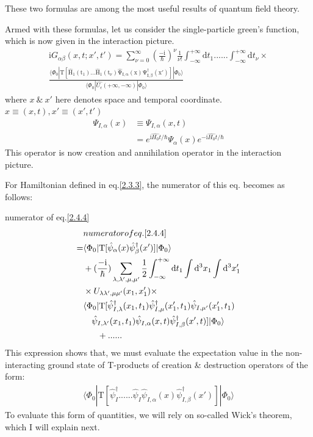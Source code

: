 These two formulas are among the most useful results of quantum field theory.


Armed with these formulas, let us consider the  single-particle green's function, which is now given in the interaction picture.
\begin{align}\label{2.4.4}
\mathrm{i}G_{\alpha\beta}(x,t;x',t')=\sum_{\nu=0}^{\infty}(\frac{-\mathrm{i}}{\hbar})^{\nu} \frac{1}{\nu!} \int_{-\infty}^{+\infty}\mathrm{d}t_1......\int_{-\infty}^{+\infty}\mathrm{d}t_{\nu}\times\nonumber  \\
\frac{\langle\Phi_0|\mathrm{T[\hat H_1(t_1)...\hat H_1(t_{\nu})\hat \Psi_{I,\alpha}(x)\Psi^{\dagger}_{I,\beta}(x')]}
|\Phi_0\rangle}{\langle\Phi_0|\hat{U_{\epsilon}}(+\infty,-\infty)|\Phi_0\rangle}
\end{align}
where $x\ \&\ x'$ here denotes space and temporal coordinate.$x\equiv(x,t),x'\equiv (x',t')$
\begin{align}
\Psi_{I,\alpha}(x)&\equiv\Psi_{I,\alpha}(x,t) \nonumber \\
&=e^{\mathrm{i}\hat{H_0}t/\hbar}\Psi_{\alpha}(x)e^{-\mathrm{i}\hat{H_0}t/\hbar} \nonumber
\end{align}
This operator is now creation and annihilation operator in the interaction picture.

For Hamiltonian defined in eq.\eqref{2.3.3}, the numerator of this eq. becomes as follows:

numerator of eq.\eqref{2.4.4}
\begin{align}\label{2.4.5}
& numerator of eq.\eqref{2.4.4} \nonumber \\
=&\langle \Phi_0|\mathrm{T}[\hat \psi_{\alpha }(x)\hat \psi_{\beta }^{\dagger}(x')]|\Phi_0\rangle \nonumber \\
&+(\frac{-\mathrm{i}}{\hbar})\sum_{\lambda,\lambda',\mu,\mu'}\frac{1}{2}\int_{-\infty}^{+\infty}\mathrm{d}t_1\int\mathrm{d}^3x_1\int\mathrm{d}^3x_1' \nonumber \\
&\times U_{\lambda\lambda',\mu\mu'}(x_1,x_1')\times \nonumber\\
&\langle\Phi_0|\mathrm{T}[\hat \psi_{I,\lambda}^{\dagger}(x_1,t_1)\hat \psi_{I,\mu}^{\dagger}(x_1',t_1)\hat \psi_{I,\mu' }(x_1',t_1) \nonumber \\
&\ \ \ \hat \psi_{I,\lambda' }(x_1,t_1)\hat \psi_{I,\alpha}(x,t)\hat \psi^{\dagger}_{I,\beta }(x',t)]|\Phi_0\rangle \nonumber \\
&\ \ \ \ \ +......
\end{align}
This expression shows that, we must evaluate the expectation value in the non-interacting ground state of T-products of creation \& destruction operators of the form:
\begin{align}
\langle\Phi_0|\mathrm{T}[\hat \psi_{I}^{\dagger}......\hat \psi_{I}\hat \psi_{I,\alpha}(x)\hat \psi^{\dagger}_{I,\beta }(x')]|\Phi_0\rangle \nonumber 
\end{align}
To evaluate this form of quantities, we will rely on so-called Wick's theorem, which I will explain next.

